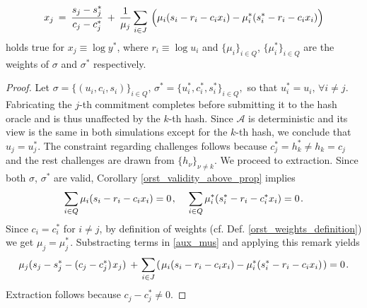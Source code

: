 \documentclass{iacrtrans}
\begin{document}
\begin{prop}
\begin{equation}
x_j
\hspace{2pt}
=
\hspace{2pt}
\frac{s_j - s_j^*}{c_j - c_j^*}
\hspace{2pt}
+
\hspace{2pt}
\frac{1}{\mu_j} \sum_{i \in J}
\hspace{2pt}
\Big(
	\mu_i (s_i - r_i - c_i x_i) -
	\mu_i^* (s_i^* - r_i - c_i x_i)
\Big)
\vspace{5pt}
\end{equation}
holds true for $x_j \equiv \log y^*$, where
$r_i \equiv \log u_i$
and 
$\{\mu_i\}_{i \in Q}$, $\{\mu_i^*\}_{i \in Q}$
are the weights of
$\sigma$ and $\sigma^*$ respectively.
\end{prop}

\begin{proof}
Let $\sigma = \{(u_i, c_i, s_i)\}_{i \in Q},\hspace{2pt}
\sigma^* = \{u_i^*, c_i^*, s_i^*\}_{i \in Q},$ so that
$u_i^* = u_i,\hspace{2pt}\forall i \neq j$.
Fabricating the $j$-th commitment completes
before submitting it to the hash oracle
and is thus unaffected by the $k$-th hash.
Since $\mathcal{A}$ is deterministic and its view is
the same in both simulations except for the $k$-th hash,
we conclude that $u_j = u_j^*$.
The constraint regarding challenges follows because
$c_j^* = h_k^* \neq h_k = c_j$
and the rest challenges are drawn from $\{h_\nu\}_{\nu \neq k}$.
We proceed to extraction.
Since both $\sigma$, $\sigma^*$ are valid, Corollary
\ref{orst_validity_above_prop} implies
\vspace{5pt}
\begin{equation}\label{aux_mus}
\sum_{i \in Q} \mu_i (s_i - r_i - c_i x_i) = 0\hspace{1pt},
\hspace{12pt}
\sum_{i \in Q} \mu_i^* (s_i^* - r_i - c_i^* x_i) = 0\hspace{1pt}.
\vspace{5pt}
\end{equation}
\noindent
Since $c_i = c^*_i$ for $i \neq j$,
by definition of weights (cf. Def. \ref{orst_weights_definition}) we get
$\mu_j = \mu^*_j\hspace{1pt}$.
Substracting terms in \eqref{aux_mus} and applying this remark yields
\vspace{5pt}
\begin{equation*}
\mu_j (s_j - s_j^* - (c_j - c_j^*)\hspace{1pt} x_j)
\hspace{2pt}
+
\hspace{1pt}
\sum_{i \in J}\hspace{1pt}
(
\hspace{1pt}
\mu_i (s_i - r_i - c_i x_i)
-
\mu_i^* (s_i^* - r_i - c_i x_i)
\hspace{1pt}
)
=
0\hspace{1pt}.
\vspace{5pt}
\end{equation*}
Extraction follows because $c_j - c_j^* \neq 0$.
\vspace{0pt}
\end{proof}
\end{document}
